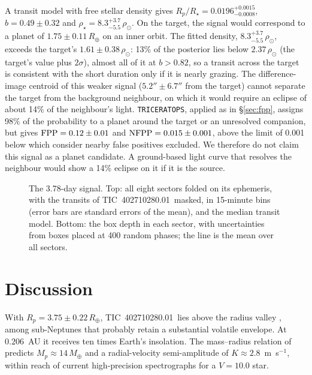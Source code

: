 \documentclass[twocolumn]{aastex631}
\newcommand{\planet}{TIC~402710280.01}
\newcommand{\rearth}{R_\oplus}
\begin{document}
A transit model with free stellar density gives $R_p/R_\star = 0.0196^{+0.0015}_{-0.0008}$, $b = 0.49 \pm 0.32$ and $\rho_\star = 8.3^{+3.7}_{-5.5}\,\rho_\odot$. On the target, the signal would correspond to a planet of $1.75 \pm 0.11\,\rearth$ on an inner orbit. The fitted density, $8.3^{+3.7}_{-5.5}\,\rho_\odot$, exceeds the target's $1.61 \pm 0.38\,\rho_\odot$: 13\% of the posterior lies below $2.37\,\rho_\odot$ (the target's value plus $2\sigma$), almost all of it at $b > 0.82$, so a transit across the target is consistent with the short duration only if it is nearly grazing. The difference-image centroid of this weaker signal ($5.2'' \pm 6.7''$ from the target) cannot separate the target from the background neighbour, on which it would require an eclipse of about 14\% of the neighbour's light. \texttt{TRICERATOPS}, applied as in \S\ref{sec:fpp}, assigns 98\% of the probability to a planet around the target or an unresolved companion, but gives ${\rm FPP} = 0.12 \pm 0.01$ and ${\rm NFPP} = 0.015 \pm 0.001$, above the limit of 0.001 below which \citet{Giacalone2021} consider nearby false positives excluded. We therefore do not claim this signal as a planet candidate. A ground-based light curve that resolves the neighbour would show a 14\% eclipse on it if it is the source.

\begin{figure}
\caption{The 3.78-day signal. Top: all eight sectors folded on its ephemeris, with the transits of \planet\ masked, in 15-minute bins (error bars are standard errors of the mean), and the median transit model. Bottom: the box depth in each sector, with uncertainties from boxes placed at 400 random phases; the line is the mean over all sectors.\label{fig:second}}
\end{figure}

\section{Discussion} \label{sec:discussion}

With $R_p = 3.75 \pm 0.22\,\rearth$, \planet\ lies above the radius valley \citep{Fulton2017}, among sub-Neptunes that probably retain a substantial volatile envelope. At $0.206$~AU it receives ten times Earth's insolation. The mass--radius relation of \citet{ChenKipping2017} predicts $M_p \approx 14\,M_\oplus$ and a radial-velocity semi-amplitude of $K \approx 2.8$~m~s$^{-1}$, within reach of current high-precision spectrographs for a $V = 10.0$ star.
\end{document}

